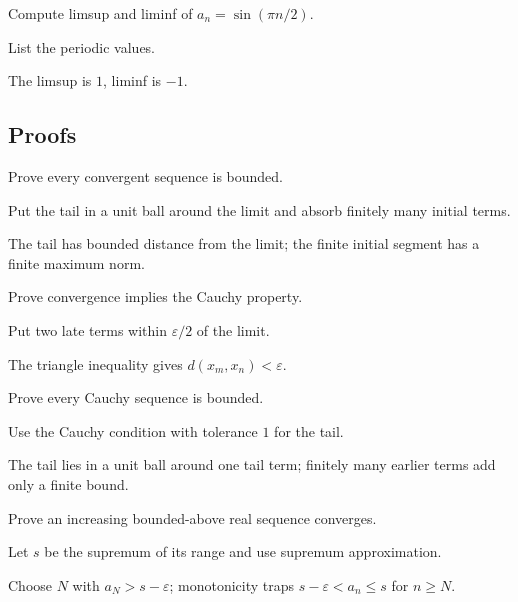 \begin{exercise}[Limsup]\label{exr:ii03-expand-05}
Compute limsup and liminf of \(a_n=\sin(\pi n/2)\).
\end{exercise}
\begin{hint}
List the periodic values.
\end{hint}
\begin{solution}
The limsup is \(1\), liminf is \(-1\).
\end{solution}

\subsection*{Proofs}

\begin{exercise}\label{exr:ii03-expand-06}
Prove every convergent sequence is bounded.
\end{exercise}
\begin{hint}
Put the tail in a unit ball around the limit and absorb finitely many initial terms.
\end{hint}
\begin{solution}
The tail has bounded distance from the limit; the finite initial segment has a finite maximum norm.
\end{solution}

\begin{exercise}\label{exr:ii03-expand-07}
Prove convergence implies the Cauchy property.
\end{exercise}
\begin{hint}
Put two late terms within \(\varepsilon/2\) of the limit.
\end{hint}
\begin{solution}
The triangle inequality gives \(d(x_m,x_n)<\varepsilon\).
\end{solution}

\begin{exercise}\label{exr:ii03-expand-08}
Prove every Cauchy sequence is bounded.
\end{exercise}
\begin{hint}
Use the Cauchy condition with tolerance \(1\) for the tail.
\end{hint}
\begin{solution}
The tail lies in a unit ball around one tail term; finitely many earlier terms add only a finite bound.
\end{solution}

\begin{exercise}\label{exr:ii03-expand-09}
Prove an increasing bounded-above real sequence converges.
\end{exercise}
\begin{hint}
Let \(s\) be the supremum of its range and use supremum approximation.
\end{hint}
\begin{solution}
Choose \(N\) with \(a_N>s-\varepsilon\); monotonicity traps \(s-\varepsilon<a_n\le s\) for \(n\ge N\).
\end{solution}

